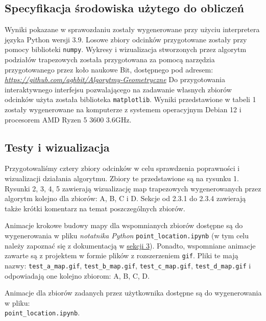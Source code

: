 \documentclass[11pt,a4paper]{article}
\begin{document}
\subsection{Specyfikacja środowiska użytego do obliczeń}
Wyniki pokazane w sprawozdaniu zostały wygenerowane przy
użyciu interpretera języka Python wersji 3.9. Losowe 
zbiory odcinków przygotowane zostały przy pomocy biblioteki
\verb|numpy|. Wykresy i wizualizacja stworzonych przez
algorytm podziałów trapezowych została przygotowana za
pomocą narzędzia przygotowanego przez koło naukowe Bit,
dostępnego pod adresem: 
\emph{\hyperlink{https://github.com/aghbit/Algorytmy-Geometryczne}
{https://github.com/aghbit/Algorytmy-Geometryczne}}
Do przygotowania interaktywnego interfejsu pozwalającego
na zadawanie własnych zbiorów odcinków użyta została
biblioteka \verb|matplotlib|.
Wyniki przedstawione w tabeli 1 zostały wygenerowane
na komputerze z systemem operacyjnym Debian 12 i procesorem
AMD Ryzen 5 3600 3.6GHz.

\subsection{Testy i wizualizacja}
Przygotowaliśmy cztery zbiory odcinków w celu sprawdzenia
poprawności i wizualizacji działania algorytmu. Zbiory te
przedstawione są na rysunku 1. Rysunki 2, 3, 4, 5 zawierają
wizualizację map trapezowych wygenerowanych przez algorytm
kolejno dla zbiorów: A, B, C i D. Sekcje od 2.3.1 do 2.3.4 %
zawierają także krótki komentarz na temat poszczególnych
zbiorów.

Animacje krokowe budowy mapy dla wspomnianych zbiorów
dostępne są do wygenerowania w pliku \textit{notatnika Python}
\verb|point_location.ipynb| (w tym celu należy zapoznać się
z dokumentacją w \hyperlink{section.3}{sekcji 3}).
Ponadto, wspomniane animacje zawarte są z projektem w formie
plików z rozszerzeniem \verb|gif|. Pliki te mają nazwy:
\verb|test_a_map.gif|, \verb|test_b_map.gif|,
\verb|test_c_map.gif|, \verb|test_d_map.gif|
i odpowiadają one kolejno zbiorom: A, B, C, D.

Animacje dla zbiorów zadanych przez użytkownika
dostępne są do wygenerowania w pliku: \\\verb|point_location.ipynb|.
\end{document}
